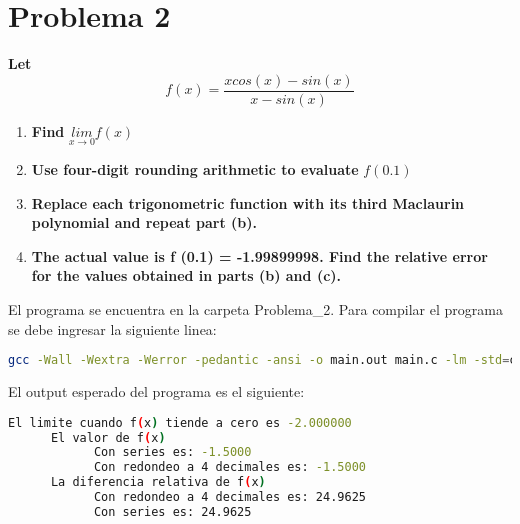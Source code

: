 \section*{Problema 2}
\textbf{Let}
\begin{equation}
      f(x) = \frac{xcos(x)-sin(x)}{x-sin(x)}
      \label{eq:problem2fx}
\end{equation}
\begin{enumerate}
      \item \textbf{Find} $\underset{x\rightarrow 0}{lim} f(x)$

            
      \item \textbf{Use four-digit rounding arithmetic to evaluate} $f(0.1)$

            
      \item \textbf{Replace each trigonometric function with its third Maclaurin polynomial and repeat part (b).}

            
      \item \textbf{The actual value is f (0.1) = -1.99899998. Find the relative error for the values obtained in parts (b) and (c).}

            
\end{enumerate}

El programa se encuentra en la carpeta \textcolor{citecolor}{Problema\_2}. Para compilar el programa se debe ingresar la siguiente linea:
\begin{lstlisting}[language=bash]
      gcc -Wall -Wextra -Werror -pedantic -ansi -o main.out main.c -lm -std=c11
\end{lstlisting}

El output esperado del programa es el siguiente:

\begin{lstlisting}[language=bash]
      El limite cuando f(x) tiende a cero es -2.000000
      El valor de f(x)
            Con series es: -1.5000
            Con redondeo a 4 decimales es: -1.5000
      La diferencia relativa de f(x)
            Con redondeo a 4 decimales es: 24.9625
            Con series es: 24.9625      
\end{lstlisting}
